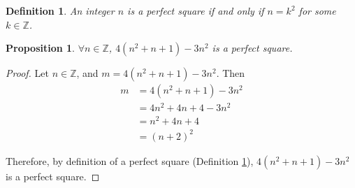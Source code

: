 \documentclass{article}
\newtheorem{definition}{Definition}
\newtheorem{proposition}{Proposition}
\begin{document}
\begin{definition}
\label{def:perfect-square}
An integer $n$ is a perfect square if and only if $n=k^2$ for some $k \in \mathbb{Z}$.
\end{definition}

\begin{proposition}
$\forall n \in \mathbb{Z}$, $4(n^2+n+1)-3n^2$ is a perfect square.
\end{proposition}

\begin{proof}
Let $n \in \mathbb{Z}$, and $m=4(n^2+n+1)-3n^2$. Then
\begin{align*}
m&=4(n^2+n+1)-3n^2\\
&=4n^2+4n+4-3n^2\\
&=n^2+4n+4\\
&=(n+2)^2
\end{align*}

Therefore, by definition of a perfect square (Definition \ref{def:perfect-square}),
$4(n^2+n+1)-3n^2$ is a perfect square.
\end{proof}
\end{document}
